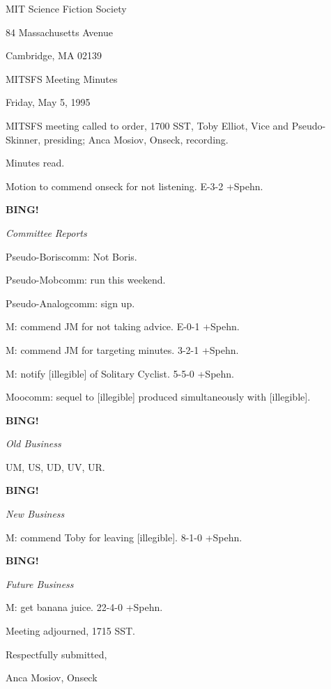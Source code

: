 \documentclass[12pt]{article}
\newcommand{\bing}{{\bf BING!} }
\newcommand{\goto}[1]{\bing \vskip 12pt \centerline{{\em{#1}}}}
\begin{document}
\begin{center}

MIT Science Fiction Society 

84 Massachusetts Avenue

Cambridge, MA 02139

\vspace{12pt}

MITSFS Meeting Minutes 

Friday, May 5, 1995

\end{center}
 
\vspace{18pt}

\setlength{\parskip}{6pt}

\noindent
MITSFS meeting called to order, 1700 SST,
Toby Elliot, Vice and Pseudo-Skinner, presiding; Anca Mosiov, Onseck, recording.

Minutes read.

Motion to commend onseck for not listening. E-3-2 +Spehn.

\goto{Committee Reports}

Pseudo-Boriscomm: Not Boris.

Pseudo-Mobcomm: run this weekend.

Pseudo-Analogcomm: sign up.

M: commend JM for not taking advice. E-0-1 +Spehn.

M: commend JM for targeting minutes. 3-2-1 +Spehn.

M: notify [illegible] of Solitary Cyclist. 5-5-0 +Spehn.

Moocomm: sequel to [illegible] produced simultaneously with [illegible].

\goto{Old Business}

UM, US, UD, UV, UR.

\goto{New Business}

M: commend Toby for leaving [illegible]. 8-1-0 +Spehn.

\goto{Future Business}

M: get banana juice. 22-4-0 +Spehn.

\vspace{12pt}

\noindent
Meeting adjourned, 1715 SST.

\vspace{18pt}

\centerline{Respectfully submitted,}
\centerline{Anca Mosiov, Onseck}
\end{document}
